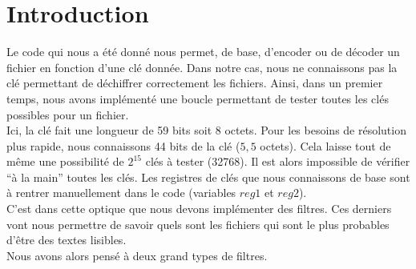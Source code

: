 \section{Introduction}
Le code qui nous a été donné nous permet, de base, d'encoder ou de décoder un fichier en fonction d'une clé donnée. Dans notre cas, nous ne connaissons pas la clé permettant de déchiffrer correctement les fichiers. Ainsi, dans un premier temps, nous avons implémenté une boucle permettant de tester toutes les clés possibles pour un fichier.\\
Ici, la clé fait une longueur de 59 bits soit 8 octets. Pour les besoins de résolution plus rapide, nous connaissons 44 bits de la clé ($5,5$ octets). Cela laisse tout de même une possibilité de $2^{15}$ clés à tester (32768). Il est alors impossible de vérifier \enquote{à la main} toutes les clés. Les registres de clés que nous connaissons de base sont à rentrer manuellement dans le code (variables $reg1$ et $reg2$).\\
C'est dans cette optique que nous devons implémenter des filtres. Ces derniers vont nous permettre de savoir quels sont les fichiers qui sont le plus probables d'être des textes lisibles.\\
Nous avons alors pensé à deux grand types de filtres.
